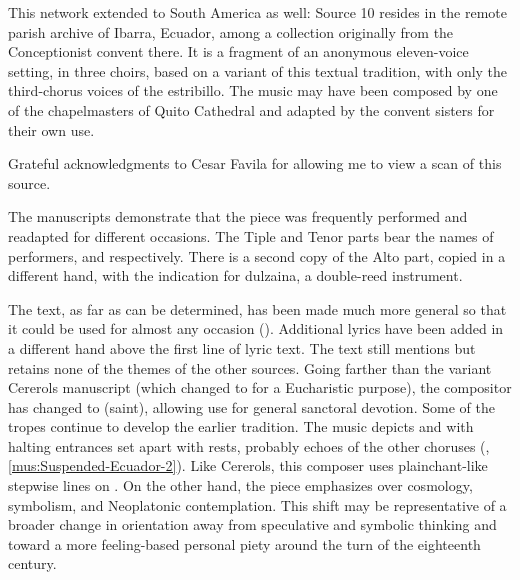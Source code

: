 This network extended to South America as well: Source 10 resides in the remote
parish archive of Ibarra, Ecuador, among a collection originally from the
Conceptionist convent there.
It is a fragment of an anonymous eleven-voice setting, in three choirs, based on
a variant of this textual tradition, with only the third-chorus voices of the
estribillo.
The music may have been composed by one of the chapelmasters of Quito Cathedral
and adapted by the convent sisters for their own use.%
\begin{Footnote}
    Grateful acknowledgments to Cesar Favila for allowing me to view a scan of
    this source.
\end{Footnote}
The manuscripts demonstrate that the piece was frequently performed and
readapted for different occasions.
The Tiple and Tenor parts bear the names of performers, 
and  respectively.
There is a second copy of the Alto part, copied in a different hand, with the
indication for dulzaina, a double-reed instrument.


The text, as far as can be determined, has been made much more general so that
it could be used for almost any occasion ().
Additional lyrics have been added in a different hand above the first line of
lyric text.
The text still mentions  but retains none of the themes of the
other sources.
Going farther than the variant Cererols manuscript (which changed 
to  for a Eucharistic purpose), the compositor has changed
 to  (saint), allowing use for general sanctoral
devotion.
Some of the tropes continue to develop the earlier tradition.
The music depicts  and  with halting
entrances set apart with rests, probably echoes of the other choruses
(, \ref{mus:Suspended-Ecuador-2}).
Like Cererols, this composer uses plainchant-like stepwise lines on .
On the other hand, the piece emphasizes  over
cosmology, symbolism, and Neoplatonic contemplation.
This shift may be representative of a broader change in orientation away from
speculative and symbolic thinking and toward a more feeling-based personal
piety around the turn of the eighteenth century.

